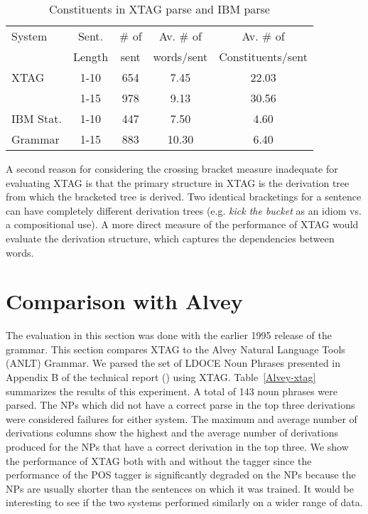 \begin{table}[ht]
\centering
\begin{tabular}{|l|c|c|c|c|} \hline
System & Sent. & \# of & Av. \# of & Av. \# of \\
& Length & sent & words/sent & Constituents/sent \\ \hline
XTAG & 1-10 & 654 & 7.45 & 22.03  \\ \cline{2-5}
& 1-15 & 978 & 9.13 & 30.56 \\ \hline
IBM Stat. & 1-10 & 447 & 7.50 & 4.60 \\ \cline{2-5}
Grammar & 1-15 & 883 & 10.30 & 6.40 \\ \hline
\end{tabular}
\caption{Constituents in XTAG parse and IBM parse}
\label{const-no}
\end{table}

A second reason for considering the crossing bracket measure
inadequate for evaluating XTAG is that the primary structure in XTAG
is the derivation tree from which the bracketed tree is derived. Two
identical bracketings for a sentence can have completely different
derivation trees (e.g. {\it kick the bucket} as an idiom vs. a
compositional use). A more direct measure of the performance of XTAG
would evaluate the derivation structure, which captures the
dependencies between words.

\section{Comparison with Alvey}

The evaluation in this section was done with the earlier 1995 release
of the grammar. This section compares XTAG to the Alvey Natural
Language Tools (ANLT) Grammar. We parsed the set of LDOCE Noun Phrases
presented in Appendix B of the technical report (\cite{Carroll93})
using XTAG.  Table~\ref{Alvey-xtag} summarizes the results of this
experiment.  A total of 143 noun phrases were parsed. The NPs which
did not have a correct parse in the top three derivations were
considered failures for either system. The maximum and average number
of derivations columns show the highest and the average number of
derivations produced for the NPs that have a correct derivation in the
top three.  We show the performance of XTAG both with and without the
tagger since the performance of the POS tagger is significantly
degraded on the NPs because the NPs are usually shorter than the
sentences on which it was trained. It would be interesting to see if
the two systems performed similarly on a wider range of data.

